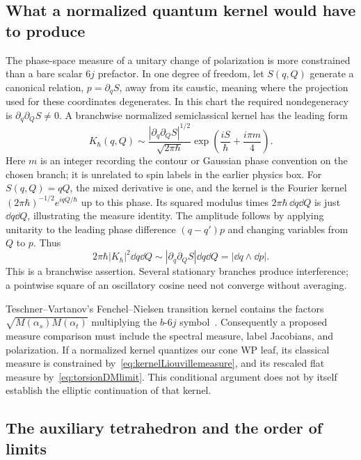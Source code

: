 \subsection{What a normalized quantum kernel would have to produce}

The phase-space measure of a unitary change of polarization is
more constrained than a bare scalar $6j$ prefactor. In one
degree of freedom, let $S(q,Q)$ generate a canonical relation,
$p=\partial_qS$, away from its caustic, meaning where the projection used for
these coordinates degenerates. In this chart the required
nondegeneracy is $\partial_q\partial_QS\ne0$.
A branchwise normalized
semiclassical kernel has the leading form
\begin{equation}
 K_\hbar(q,Q)\sim
  \frac{|\partial_q\partial_QS|^{1/2}}{\sqrt{2\pi\hbar}}
       \exp\left(\frac{iS}{\hbar}+\frac{i\pi m}{4}\right).
 \label{eq:normalizedWKBkernel}
\end{equation}
Here $m$ is an integer recording the contour or Gaussian phase
convention on the chosen branch; it is unrelated to spin labels
in the earlier physics box. For $S(q,Q)=qQ$, the mixed derivative
is one, and the kernel is the Fourier kernel
$(2\pi\hbar)^{-1/2}e^{iqQ/\hbar}$ up to this phase. Its squared
modulus times $2\pi\hbar\,\dd q\dd Q$ is just
$\dd q\dd Q$, illustrating the measure identity.
The amplitude follows by applying unitarity to the leading
phase difference $(q-q')p$ and changing variables from $Q$ to
$p$. Thus
\begin{equation}
 2\pi\hbar|K_\hbar|^2\dd q\dd Q
     \sim |\partial_q\partial_QS|\dd q\dd Q
     =|\dd q\wedge\dd p|.
 \label{eq:kernelLiouvillemeasure}
\end{equation}
This is a branchwise assertion. Several stationary branches
produce interference; a pointwise square of an oscillatory
cosine need not converge without averaging.

Teschner--Vartanov's Fenchel--Nielsen transition kernel contains
the factors $\sqrt{M(\alpha_s)M(\alpha_t)}$ multiplying the
$b$-$6j$ symbol~\cite[eq.~(5.14)]{TeschnerVartanov}.
Consequently a proposed measure comparison must include the
spectral measure, label Jacobians, and polarization. If a
normalized kernel quantizes our cone WP leaf, its classical
measure is constrained by~\eqref{eq:kernelLiouvillemeasure},
and its rescaled flat measure by~\eqref{eq:torsionDMlimit}.
This conditional argument does not by itself establish the
elliptic continuation of that kernel.

\subsection{The auxiliary tetrahedron and the order of limits}

